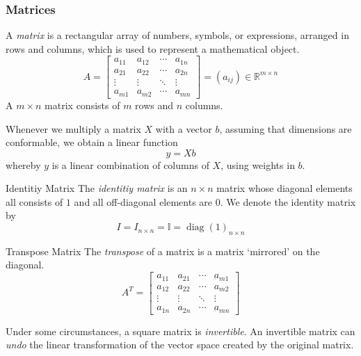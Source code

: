 \documentclass[11pt, %
	oneside, %
	english, %
	onehalfspacing, %
	]{article} %
\numberwithin{equation}{section}
\begin{document}
\subsubsection{Matrices}

A \emph{matrix} is a rectangular array of numbers, symbols, or expressions, arranged in rows and columns, which is used to represent a mathematical object.
$$
A=\left[\begin{array}{cccc}a_{11} & a_{12} & \cdots & a_{1 n} \\ a_{21} & a_{22} & \cdots & a_{2 n} \\ \vdots & \vdots & \ddots & \vdots \\ a_{m 1} & a_{m 2} & \cdots & a_{m n}\end{array}\right]=\left(a_{i j}\right) \in \mathbb{R}^{m \times n}$$
A $m \times n$ matrix consists of $m$ rows and $n$ columns.

Whenever we multiply a matrix $X$ with a vector $b$, assuming that dimensions are conformable, we obtain a linear function
\begin{equation*}
    y = X b
\end{equation*}
whereby $y$ is a linear combination of columns of $X$, using weights in $b$.

\begin{definition}{Identitiy Matrix}{}
    The \emph{identitiy matrix} is an $n \times n$ matrix whose diagonal elements all consists of $1$ and all off-diagonal elements are $0$. We denote the identity matrix by
    \begin{equation*}
        I = I_{n \times n} = \mathbb{I} = \operatorname{diag}(1)_{n \times n}
    \end{equation*}

\end{definition}

\begin{definition}{Transpose Matrix}{}
    The \emph{transpose} of a matrix is a matrix `mirrored' on the diagonal.
    $$
    A^T=\left[\begin{array}{cccc}a_{11} & a_{21} & \cdots & a_{m 1} \\ a_{12} & a_{22} & \cdots & a_{m 2} \\ \vdots & \vdots & \ddots & \vdots \\ a_{1 n} & a_{2 n} & \cdots & a_{m n}\end{array}\right]
    $$
\end{definition}

Under some circumstances, a square matrix is \textit{invertible}. An invertible matrix can \textit{undo} the linear transformation of the vector space created by the original matrix.
\end{document}
